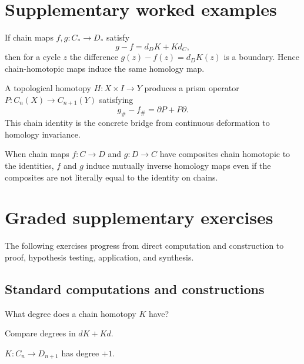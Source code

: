 \section{Supplementary worked examples}
\label{sec:viii22-pedagogy}

\begin{example}\label{ex:viii22-ped-01}
If chain maps $f,g:C_*\to D_*$ satisfy
\[
g-f=d_DK+Kd_C,
\]
then for a cycle $z$ the difference $g(z)-f(z)=d_DK(z)$ is a boundary. Hence chain-homotopic maps induce the same homology map.
\end{example}

\begin{example}\label{ex:viii22-ped-02}
A topological homotopy $H:X\times I\to Y$ produces a prism operator $P:C_n(X)\to C_{n+1}(Y)$ satisfying
\[
g_\#-f_\#=\partial P+P\partial.
\]
This chain identity is the concrete bridge from continuous deformation to homology invariance.
\end{example}

\begin{example}\label{ex:viii22-ped-03}
When chain maps $f:C\to D$ and $g:D\to C$ have composites chain homotopic to the identities, $f$ and $g$ induce mutually inverse homology maps even if the composites are not literally equal to the identity on chains.
\end{example}

\section{Graded supplementary exercises}
The following exercises progress from direct computation and construction to proof, hypothesis testing, application, and synthesis.

\subsection*{Standard computations and constructions}

\begin{exercise}[Degree of K]\label{exr:viii22-ped-01}
What degree does a chain homotopy $K$ have?
\end{exercise}
\begin{hint}
Compare degrees in $dK+Kd$.
\end{hint}
\begin{solution}
$K:C_n\to D_{n+1}$ has degree $+1$.
\end{solution}

